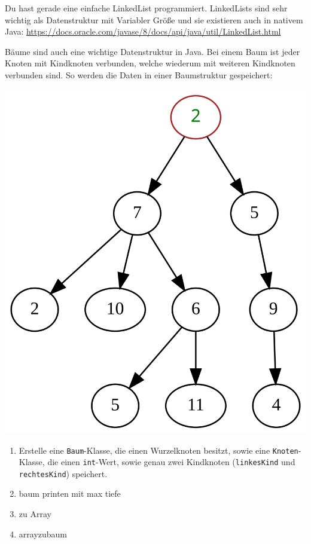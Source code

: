 \documentclass{../../sheet}
\begin{document}
Du hast gerade eine einfache LinkedList programmiert. LinkedLists sind sehr wichtig als Datenstruktur mit Variabler Größe und sie existieren auch in nativem Java: \url{https://docs.oracle.com/javase/8/docs/api/java/util/LinkedList.html}

\newpage
{}
Bäume sind auch eine wichtige Datenstruktur in Java. Bei einem Baum ist jeder Knoten mit Kindknoten verbunden, welche wiederum mit weiteren Kindknoten verbunden sind. So werden die Daten in einer Baumstruktur gespeichert:
\\
\begin{center}
    \includegraphics[width=0.5\linewidth]{img/baum.png}    
\end{center}

\begin{enumerate}
    \item Erstelle eine \texttt{Baum}-Klasse, die einen Wurzelknoten besitzt, sowie eine \texttt{Knoten}-Klasse, die einen \texttt{int}-Wert, sowie genau zwei Kindknoten (\texttt{linkesKind} und \texttt{rechtesKind}) speichert.
    \item baum printen mit max tiefe
    \item zu Array
    \item arrayzubaum
\end{enumerate}
\end{document}
